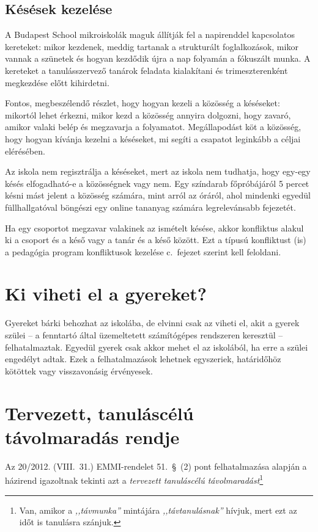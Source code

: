 \documentclass{article}
\begin{document}
\subsection{Késések kezelése}
A Budapest School mikroiskolák maguk állítják fel a napirenddel kapcsolatos kereteket: mikor kezdenek, meddig tartanak a strukturált foglalkozások, mikor vannak a szünetek és hogyan kezdődik újra a nap folyamán a fóku\-szált munka. A kereteket a tanulásszervező tanárok feladata kialakítani és trimeszterenként megkezdése előtt kihirdetni.

Fontos, megbeszélendő részlet, hogy hogyan kezeli a közösség a késéseket: mikortól lehet érkezni, mikor kezd a közösség annyira dolgozni, hogy zavaró, amikor valaki belép és megzavarja a folyamatot. Megállapodást köt a közösség, hogy hogyan kívánja kezelni a késéseket, mi segíti a csapatot leginkább a céljai elérésében.

Az iskola nem regisztrálja a késéseket, mert az iskola nem tudhatja, hogy egy-egy késés elfogadható-e a közösségnek vagy nem. Egy színdarab főpróbájáról 5 percet késni mást jelent a közösség számára, mint arról az óráról, ahol mindenki egyedül füllhallgatóval böngészi egy online tananyag számára legrelevánsabb fejezetét.

Ha egy csoportot megzavar valakinek az ismételt késése, akkor konfliktus alakul ki a csoport és a késő vagy a tanár és a késő között. Ezt a típusú konfliktust (is) a pedagógia program konfliktusok kezelése c.~fejezet szerint kell feloldani.

\section{Ki viheti el a gyereket?}

Gyereket bárki behozhat az iskolába, de elvinni csak az viheti el, akit a gyerek szülei -- a fenntartó által üzemeltetett számítógépes rendszeren keresztül -- felhatalmaztak. Egyedül gyerek csak akkor mehet el az iskolából, ha erre a szülei engedélyt adtak. Ezek a felhatalmazások lehetnek egyszeriek, határidőhöz kötöttek vagy visszavonásig érvényesek.



\section{Tervezett, tanuláscélú távolmaradás rendje}
Az 20/2012. (VIII.~31.) EMMI-rendelet 51.~§~(2) pont felhatalmazása alapján a házirend igazoltnak tekinti azt a \emph{tervezett tanuláscélú távolmaradást}\footnote{Van, amikor a \emph{,,távmunka''} mintájára \emph{,,távtanulásnak''} hívjuk, mert ezt az időt is tanulásra szánjuk.}
\end{document}
